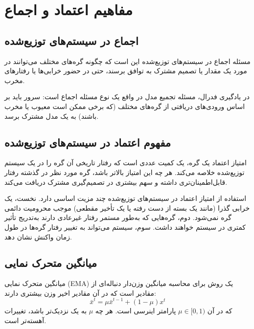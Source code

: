 \section{مفاهیم اعتماد و اجماع}
\label{sec:trust_concepts}

\subsection{اجماع در سیستم‌های توزیع‌شده}

\begin{ntdefinition}
مسئله اجماع در سیستم‌های توزیع‌شده این است که چگونه گره‌های مختلف می‌توانند در مورد یک مقدار یا تصمیم مشترک به توافق برسند، حتی در حضور خرابی‌ها یا رفتارهای مخرب.
\end{ntdefinition}

در یادگیری فدرال، مسئله تجمیع مدل در واقع یک نوع مسئله اجماع است: سرور باید بر اساس ورودی‌های دریافتی از گره‌های مختلف (که برخی ممکن است معیوب یا مخرب باشند) به یک مدل مشترک برسد.

\subsection{مفهوم اعتماد در سیستم‌های توزیع‌شده}

\begin{ntdefinition}
امتیاز اعتماد یک گره، یک کمیت عددی است که رفتار تاریخی آن گره را در یک سیستم توزیع‌شده خلاصه می‌کند. هر چه این امتیاز بالاتر باشد، گره مورد نظر در گذشته رفتار قابل‌اطمینان‌تری داشته و سهم بیشتری در تصمیم‌گیری مشترک دریافت می‌کند.
\end{ntdefinition}

استفاده از امتیاز اعتماد در سیستم‌های توزیع‌شده چند مزیت اساسی دارد. نخست، یک خرابی گذرا (مانند یک بسته از دست رفته یا یک تأخیر مقطعی) موجب محرومیت دائمی گره نمی‌شود. دوم، گره‌هایی که به‌طور مستمر رفتار غیرعادی دارند به‌تدریج تأثیر کمتری در سیستم خواهند داشت. سوم، سیستم می‌تواند به تغییر رفتار گره‌ها در طول زمان واکنش نشان دهد.

\subsection{میانگین متحرک نمایی}

\begin{ntdefinition}
میانگین متحرک نمایی (\gls{EMA}) یک روش برای محاسبه میانگین وزن‌دار دنباله‌ای از مقادیر است که در آن مقادیر اخیر وزن بیشتری دارند:
\begin{equation}
    \bar{x}^t = \mu \bar{x}^{t-1} + (1 - \mu) x^t
    \label{eq:ema}
\end{equation}
که در آن $\mu \in [0, 1)$ پارامتر اینرسی است. هر چه $\mu$ به یک نزدیک‌تر باشد، تغییرات آهسته‌تر است.
\end{ntdefinition}

